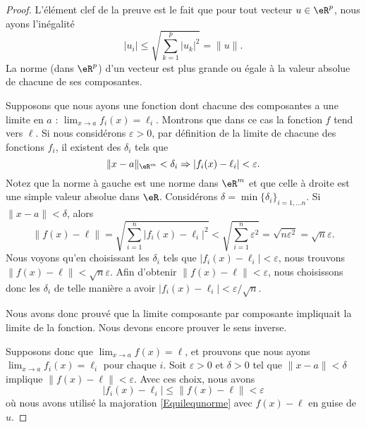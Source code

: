 \begin{proof}
	L'élément clef de la preuve est le fait que pour tout vecteur \( u\in\eR^p\), nous ayons l'inégalité
	\begin{equation}	\label{Equilequnorme}
		| u_i |\leq\sqrt{\sum_{k=1}^p| u_k |^2}=\| u \|.
	\end{equation}
	La norme (dans \( \eR^p\)) d'un vecteur est plus grande ou égale à la valeur absolue de chacune de ses composantes.

	Supposons que nous ayons une fonction dont chacune des composantes a une limite en \( a\) : \( \lim_{x\to a} f_i(x)=\ell_i\). Montrons que dans ce cas la fonction \( f\) tend vers \( \ell\). Si nous considérons \( \varepsilon>0\), par définition de la limite de chacune des fonctions \( f_i\), il  existent des \( \delta_i\) tels que
	\begin{equation}
		\| x-a \|_{\eR^m}<\delta_i\Rightarrow | f_i(x)-\ell_i |<\varepsilon.
	\end{equation}
	Notez que la norme à gauche est une norme dans \( \eR^m\) et que celle à droite est une simple valeur absolue dans \( \eR\). Considérons \( \delta=\min\{ \delta_i \}_{i=1,\ldots n}\). Si \( \| x-a \|<\delta\), alors
	\begin{equation}
		\| f(x)-\ell \|=\sqrt{\sum_{i=1}^n| f_i(x)-\ell_i |^2}<\sqrt{\sum_{i=1}^n\varepsilon^2}=\sqrt{n\varepsilon^2}=\sqrt{n}\varepsilon.
	\end{equation}
	Nous voyons qu'en choisissant les \( \delta_i\) tels que \( | f_i(x)-\ell_i |<\varepsilon\), nous trouvons \( \| f(x)-\ell \|<\sqrt{n}\varepsilon\). Afin d'obtenir \( \| f(x)-\ell \|<\varepsilon\), nous choisissons donc les \( \delta_i\) de telle manière a avoir \( | f_i(x)-\ell_i |<\varepsilon/\sqrt{n}\).

	Nous avons donc prouvé que la limite composante par composante impliquait la limite de la fonction. Nous devons encore prouver le sens inverse.

	Supposons donc que \( \lim_{x\to a} f(x)=\ell\), et prouvons que nous ayons \( \lim_{x\to a} f_i(x)=\ell_i\) pour chaque \( i\). Soit \( \varepsilon>0\) et \( \delta>0\) tel que \( \| x-a \|<\delta\) implique \( \| f(x)-\ell \|<\varepsilon\). Avec ces choix, nous avons
	\begin{equation}
		| f_i(x)-\ell_i |\leq\| f(x)-\ell \|<\varepsilon
	\end{equation}
	où nous avons utilisé la majoration \eqref{Equilequnorme} avec \( f(x)-\ell\) en guise de \( u\).
\end{proof}

